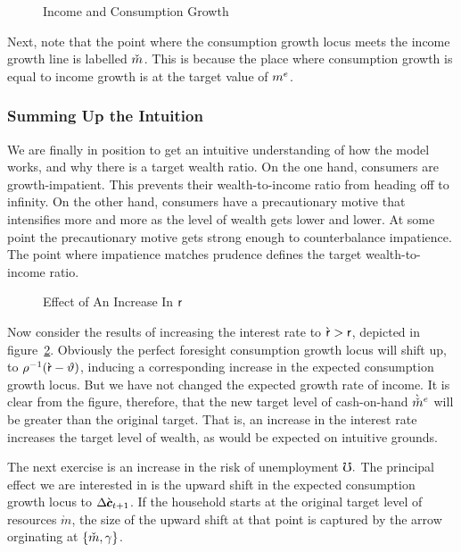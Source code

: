 \documentclass{handout}
\begin{document}
\begin{figure}
\caption{Income and Consumption Growth}\label{fig:GrowthA}
\end{figure}

Next, note that the point where the consumption growth locus
meets the income growth line is labelled $\mTarg^{\null}$.  This is
because the place where consumption growth is equal to income
growth is at the target value of $m^{e}$.



\subsubsection{Summing Up the Intuition}
We are finally in position to get an intuitive understanding of how the
model works, and why there is a target wealth ratio.  On the one hand,
consumers are growth-impatient.  This prevents their wealth-to-income ratio
from heading off to infinity.  On the other hand, consumers have
a precautionary motive that intensifies more and more as the level of
wealth gets lower and lower.  At some point the precautionary motive
gets strong enough to counterbalance impatience.  The point where impatience matches prudence defines the
target wealth-to-income ratio.


\begin{figure}
\caption{Effect of An Increase In $\mathsf{r}$}
\label{fig:GrowthB}
\end{figure}

Now consider the results of increasing the interest rate to
$\grave{\mathsf{r}}>\mathsf{r}$, depicted in figure~\ref{fig:GrowthB}.  Obviously the perfect foresight consumption
growth locus will shift up, to $\rho^{-1}(\grave{\mathsf{r}}-\vartheta)$,
inducing a corresponding increase in the expected consumption growth
locus.  But we have not changed the expected growth rate of income.
It is clear from the figure, therefore, that the new target level of
cash-on-hand $\grave{\check{m}}^{e}$ will be greater than the original target.
That is, an increase in the interest rate increases the target level
of wealth, as would be expected on intuitive grounds.

The next exercise is an increase in the risk of unemployment $\mho.$
The principal effect we are interested in is the upward shift in the expected
consumption growth locus to $\Delta \grave{\pmb{c}}_{t+1}$.  If the
household starts at the original target level of resources
$\grave{m}$, the size of the upward shift at that point is captured by the
arrow orginating at $\{\check{m},\gamma\}$.  
\end{document}
